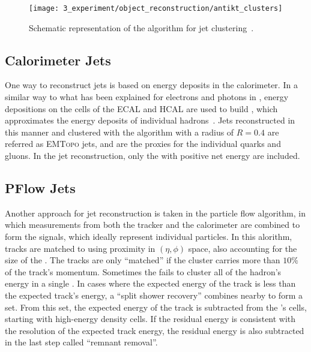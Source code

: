 \begin{figure}[ht!]
    \centering
    \texttt{[image: 3\_experiment/object\_reconstruction/antikt\_clusters]}
    \caption{Schematic representation of the \antikt algorithm for jet clustering~\cite{AntiKtAlgorithm}.}
    \label{fig:objects:jets:antikt}
\end{figure}

\subsection{Calorimeter Jets}

One way to reconstruct jets is based on energy deposits in the calorimeter. In a similar way to what has been explained for electrons and photons in \Sect{\ref{subsec:objects:egamma:reco}}, energy depositions on the cells of the \ac{ECAL} and \ac{HCAL} are used to build \topos, which approximates the energy deposits of individual hadrons~\cite{ATLAS-TopoClusters-Run1,ATLAS-TopoClusters-Run2}. Jets reconstructed in this manner and clustered with the \antikt algorithm with a radius of \(R=0.4\) are referred as \textsc{EMTopo} jets, and are the proxies for the individual quarks and gluons. In the jet reconstruction, only the \topos with positive net energy are included.

\subsection{PFlow Jets}

Another approach for jet reconstruction is taken in the particle flow algorithm, in which measurements from both the tracker and the calorimeter are combined to form the signals, which ideally represent individual particles.
In this alorithm, tracks are matched to \topos using proximity in \((\eta,\phi)\) space, also accounting for the size of the \topo. The tracks are only “matched” if the cluster carries more than \(10\%\) of the track's momentum. Sometimes the \topo fails to cluster all of the hadron's energy in a single \topo. In cases where the expected energy of the track is less than the expected track's energy, a “split shower recovery” combines nearby \topos to form a \topo set. From this \topo set, the expected energy of the track is subtracted from the \topo's cells, starting with high-energy density cells. If the residual energy is consistent with the resolution of the expected track energy, the residual energy is also subtracted in the last step called “remnant removal”.

